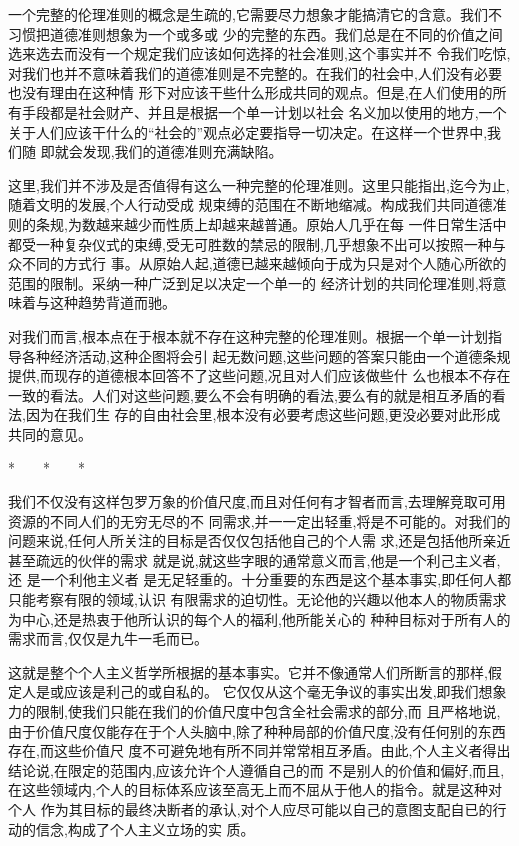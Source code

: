 ﻿\documentclass[12pt]{article}
\begin{document}
一个完整的伦理准则的概念是生疏的,它需要尽力想象才能搞清它的含意。我们不习惯把道德准则想象为一个或多或
少的完整的东西。我们总是在不同的价值之间选来选去而没有一个规定我们应该如何选择的社会准则,这个事实并不
令我们吃惊,对我们也并不意味着我们的道德准则是不完整的。在我们的社会中,人们没有必要也没有理由在这种情
形下对应该干些什么形成共同的观点。但是,在人们使用的所有手段都是社会财产、并且是根据一个单一计划以社会
名义加以使用的地方,一个关于人们应该干什么的``社会的''观点必定要指导一切决定。在这样一个世界中,我们随
即就会发现,我们的道德准则充满缺陷。

这里,我们并不涉及是否值得有这么一种完整的伦理准则。这里只能指出,迄今为止,随着文明的发展,个人行动受成
规束缚的范围在不断地缩减。构成我们共同道德准则的条规,为数越来越少而性质上却越来越普通。原始人几乎在每
一件日常生活中都受一种复杂仪式的束缚,受无可胜数的禁忌的限制,几乎想象不出可以按照一种与众不同的方式行
事。从原始人起,道德已越来越倾向于成为只是对个人随心所欲的范围的限制。采纳一种广泛到足以决定一个单一的
经济计划的共同伦理准则,将意味着与这种趋势背道而驰。

对我们而言,根本点在于根本就不存在这种完整的伦理准则。根据一个单一计划指导各种经济活动,这种企图将会引
起无数问题,这些问题的答案只能由一个道德条规提供,而现存的道德根本回答不了这些问题,况且对人们应该做些什
么也根本不存在一致的看法。人们对这些问题,要么不会有明确的看法,要么有的就是相互矛盾的看法,因为在我们生
存的自由社会里,根本没有必要考虑这些问题,更没必要对此形成共同的意见。

*　　*　　*

我们不仅没有这样包罗万象的价值尺度,而且对任何有才智者而言,去理解竞取可用资源的不同人们的无穷无尽的不
同需求,并一一定出轻重,将是不可能的。对我们的问题来说,任何人所关注的目标是否仅仅包括他自己的个人需
求,还是包括他所亲近甚至疏远的伙伴的需求 \myrule 就是说,就这些字眼的通常意义而言,他是一个利己主义者,还
是一个利他主义者 \myrule 是无足轻重的。十分重要的东西是这个基本事实,即任何人都只能考察有限的领域,认识
有限需求的迫切性。无论他的兴趣以他本人的物质需求为中心,还是热衷于他所认识的每个人的福利,他所能关心的
种种目标对于所有人的需求而言,仅仅是九牛一毛而已。

这就是整个个人主义哲学所根据的基本事实。它并不像通常人们所断言的那样,假定人是或应该是利己的或自私的。
它仅仅从这个毫无争议的事实出发,即我们想象力的限制,使我们只能在我们的价值尺度中包含全社会需求的部分,而
且严格地说,由于价值尺度仅能存在于个人头脑中,除了种种局部的价值尺度,没有任何别的东西存在,而这些价值尺
度不可避免地有所不同并常常相互矛盾。由此,个人主义者得出结论说,在限定的范围内,应该允许个人遵循自己的而
不是别人的价值和偏好,而且,在这些领域内,个人的目标体系应该至高无上而不屈从于他人的指令。就是这种对个人
作为其目标的最终决断者的承认,对个人应尽可能以自己的意图支配自已的行动的信念,构成了个人主义立场的实
质。
\end{document}
